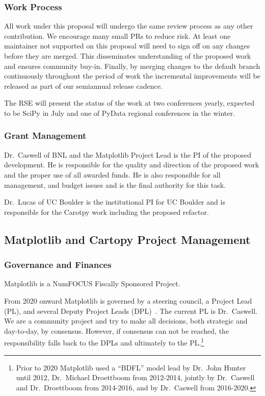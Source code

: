 \documentclass[12pt]{article}
\numberwithin{page}{section}
\begin{document}
\subsubsection{Work Process}

All work under this proposal will undergo the same review process
as any other contribution.  We
encourage many small PRs to reduce risk.  At least one maintainer not
supported on this proposal
will need to sign off on any changes before they are merged. This
disseminates understanding of the proposed work and ensures
community buy-in.  Finally, by merging
changes to the default branch continuously throughout the period of
work the incremental improvements will be released as part of our
semiannual release cadence.

The RSE will present the status of the work at two conferences yearly,
expected to be SciPy in July and one of PyData regional conferences in
the winter.


\subsubsection{Grant Management}

Dr.\ Caswell of BNL and the Matplotlib Project Lead is the PI of the proposed
development.  He is responsible for the quality and direction of the proposed
work and the proper use of all awarded funds.  He is also responsible for all
management, and budget issues and is the final authority for this task.

Dr.\ Lucas of UC Boulder is the institutional PI for UC Boulder and is
responsible for the Carotpy work including the proposed refactor.


\subsection{Matplotlib and Cartopy Project Management}
\subsubsection{Governance and Finances}

Matplotlib is a NumFOCUS Fiscally Sponsored Project.

From 2020 onward Matplotlib is governed by a steering council, a Project Lead
(PL), and several Deputy Project Leads (DPL)~\cite{gov}.  The current PL is
Dr.\ Caswell.  We are a community project and try to make all decisions, both
strategic and day-to-day, by consensus.  However, if consensus can not be
reached, the responsibility falls back to the DPLs and ultimately to the
PL.\footnote{Prior to 2020 Matplotlib used a ``BDFL'' model lead by Dr.\ John
Hunter until 2012, Dr.\ Michael Droettboom from 2012-2014, jointly by
Dr.\ Caswell and Dr.\ Droettboom from 2014-2016, and by Dr.\ Caswell from
2016-2020.}
\end{document}

